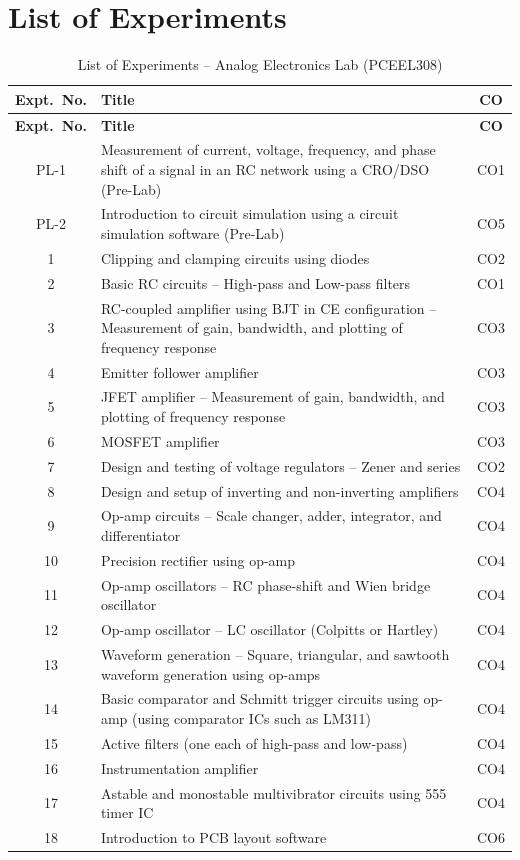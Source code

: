 \chapter*{List of Experiments}
\begin{longtable}{|c|p{10cm}|c|}
	\caption{List of Experiments -- Analog Electronics Lab (PCEEL308)}
	\label{tab:experiment-list} \\
	\hline
	\textbf{Expt.\ No.} & \textbf{Title} & \textbf{CO} \\
	\hline
	\endfirsthead
	\hline
	\textbf{Expt.\ No.} & \textbf{Title} & \textbf{CO} \\
	\hline
	\endhead
	\hline
	\endfoot
	\hline
	\endlastfoot
	PL-1 & Measurement of current, voltage, frequency, and phase shift of a signal in an RC network using a CRO/DSO (Pre-Lab) & CO1 \\
	\hline
	PL-2 & Introduction to circuit simulation using a circuit simulation software (Pre-Lab) & CO5 \\
	\hline
	1 & Clipping and clamping circuits using diodes & CO2 \\
	\hline
	2 & Basic RC circuits -- High-pass and Low-pass filters & CO1 \\
	\hline
	3 & RC-coupled amplifier using BJT in CE configuration -- Measurement of gain, bandwidth, and plotting of frequency response & CO3 \\
	\hline
	4 & Emitter follower amplifier & CO3 \\
	\hline
	5 & JFET amplifier -- Measurement of gain, bandwidth, and plotting of frequency response & CO3 \\
	\hline
	6 & MOSFET amplifier & CO3 \\
	\hline
	7 & Design and testing of voltage regulators -- Zener and series & CO2 \\
	\hline
	8 & Design and setup of inverting and non-inverting amplifiers & CO4 \\
	\hline
	9 & Op-amp circuits -- Scale changer, adder, integrator, and differentiator & CO4 \\
	\hline
	10 & Precision rectifier using op-amp & CO4 \\
	\hline
	11 & Op-amp oscillators -- RC phase-shift and Wien bridge oscillator & CO4 \\
	\hline
	12 & Op-amp oscillator -- LC oscillator (Colpitts or Hartley) & CO4 \\
	\hline
	13 & Waveform generation -- Square, triangular, and sawtooth waveform generation using op-amps & CO4 \\
	\hline
	14 & Basic comparator and Schmitt trigger circuits using op-amp (using comparator ICs such as LM311) & CO4 \\
	\hline
	15 & Active filters (one each of high-pass and low-pass) & CO4 \\
	\hline
	16 & Instrumentation amplifier & CO4 \\
	\hline
	17 & Astable and monostable multivibrator circuits using 555 timer IC & CO4 \\
	\hline
	18 & Introduction to PCB layout software & CO6 \\
	\hline
\end{longtable}

